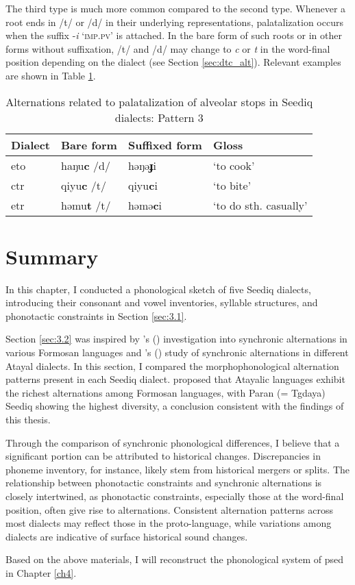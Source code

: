 The third type is much more common compared to the second type. Whenever a root ends in /t/ or /d/ in their underlying representations, palatalization occurs when the suffix -\textit{i} `\textsc{imp.pv}' is attached. In the bare form of such roots or in other forms without suffixation, /t/ and /d/ may change to \textit{c} or \textit{t} in the word-final position depending on the dialect (see Section \ref{sec:dtc_alt}). Relevant examples are shown in Table \ref{tab:cjtd_alt_3}.

\begin{table}[!htbp]
\centering
\caption{Alternations related to palatalization of alveolar stops in Seediq dialects: Pattern 3}
\label{tab:cjtd_alt_3}
\begin{tabular}{llll}
\hline
Dialect   & Bare form & Suffixed form & Gloss                 \\ \hline
\acl{eto} & haŋu\textbf{c} /d/    & həŋə\textbf{ɟ}i       & `to cook'             \\
\acl{ctr} & qiyu\textbf{c} /t/    & qiyu\textbf{c}i       & `to bite'             \\
\acl{etr} & həmu\textbf{t} /t/    & həmə\textbf{c}i       & `to do sth. casually' \\ \hline
\end{tabular}
\end{table}

\section{Summary}

In this chapter, I conducted a phonological sketch of five Seediq dialects, introducing their consonant and vowel inventories, syllable structures, and phonotactic constraints in Section \ref{sec:3.1}. 

Section \ref{sec:3.2} was inspired by \citeauthor{li1977morphophonemic}'s (\citeyear{li1977morphophonemic}) investigation into synchronic alternations in various Formosan languages and \citeauthor{goderich2020phd}'s (\citeyear{goderich2020phd}) study of synchronic alternations in different Atayal dialects. In this section, I compared the morphophonological alternation patterns present in each Seediq dialect. \textcite{li1977morphophonemic} proposed that Atayalic languages exhibit the richest alternations among Formosan languages, with Paran (= Tgdaya) Seediq showing the highest diversity, a conclusion consistent with the findings of this thesis.

Through the comparison of synchronic phonological differences, I believe that a significant portion can be attributed to historical changes. Discrepancies in phoneme inventory, for instance, likely stem from historical mergers or splits. The relationship between phonotactic constraints and synchronic alternations is closely intertwined, as phonotactic constraints, especially those at the word-final position, often give rise to alternations. Consistent alternation patterns across most dialects may reflect those in the proto-language, while variations among dialects are indicative of surface historical sound changes.

Based on the above materials, I will reconstruct the phonological system of \acl{psed} in Chapter \ref{ch4}.

